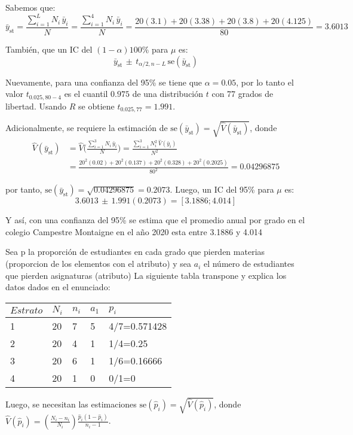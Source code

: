 \documentclass[
]{article}
\begin{document}
Sabemos que:
\[\bar{y}_\text{st} = \frac{\sum_{i = 1}^L N_i\,\bar{y}_i}{N} = \frac{\sum_{i = 1}^4 N_i\,\bar{y}_i}{N} = \frac{20(3.1 ) + 20(3.38) + 20(3.8)+ 20(4.125 )}{80} = 3.6013\]

También, que un IC del \((1 - \alpha)100\%\) para \(\mu\) es:
\[\bar{y}_\text{st} \,\pm\, t_{\alpha/2, n - L}\, \text{se}(\bar{y}_\text{st})\]

Nuevamente, para una confianza del 95\% se tiene que \(\alpha = 0.05\),
por lo tanto el valor \(t_{0.025, 80 - 4}\) es el cuantil \(0.975\) de
una distribución \(t\) con 77 grados de libertad. Usando \(R\) se
obtiene \(t_{0.025, 77} = 1.991\).

Adicionalmente, se requiere la estimación de
\(\text{se}(\bar{y}_\text{st}) = \sqrt{\widehat{V}(\bar{y}_\text{st})}\),
donde \[
        \begin{aligned}
        \widehat{V}(\bar{y}_\text{st}) &= \widehat{V}\Big(\frac{\sum_{i = 1}^3 N_i\,\bar{y}_i}{N}\Big) = \frac{\sum_{i = 1}^3 N_i^2\,\widehat{V}(\bar{y}_i)}{N^2}\\[0.2cm]
        &= \frac{20^2( 0.02) + 20^2(0.137) + 20^2(0.328) + 20^2(0.2025)}{80^2} = 0.04296875
        \end{aligned}
        \]

por tanto,
\(\text{se}(\bar{y}_\text{st}) = \sqrt{ 0.04296875} = 0.2073\). Luego,
un IC del 95\% para \(\mu\) es:
\[ 3.6013 \,\pm\, 1.991( 0.2073) = [3.1886; 4.014]\]

Y así, con una confianza del 95\% se estima que el promedio anual por
grado en el colegio Campestre Montaigne en el año 2020 esta entre 3.1886
y 4.014

Sea p la proporción de estudiantes en cada grado que pierden materias
(proporcion de los elementos con el atributo) y sea \(a_i\) el número de
estudiantes que pierden asignaturas (atributo) La siguiente tabla
transpone y explica los datos dados en el enunciado:

\begin{longtable}[]{@{}lllll@{}}
\toprule
\(Estrato\) & \(N_i\) & \(n_i\) & \(a_1\) & \(p_i\)\tabularnewline
\midrule
\endhead
1 & 20 & 7 & 5 & 4/7=0.571428\tabularnewline
2 & 20 & 4 & 1 & 1/4=0.25\tabularnewline
3 & 20 & 6 & 1 & 1/6=0.16666\tabularnewline
4 & 20 & 1 & 0 & 0/1=0\tabularnewline
\bottomrule
\end{longtable}

Luego, se necesitan las estimaciones
\(\text{se}(\widehat{p}_i) = \sqrt{\widehat{V}(\widehat{p}_i)}\), donde
\(\widehat{V}(\widehat{p}_i) = (\frac{N_i - n_i}{N_i})\frac{\widehat{p}_i(1-\widehat{p}_i)}{n_i - 1}\).
\end{document}
